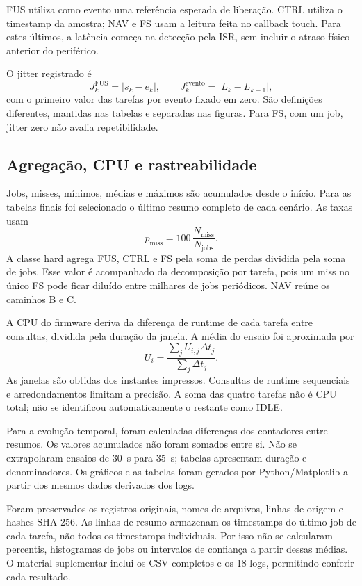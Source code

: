 FUS utiliza como evento uma referência esperada de liberação. CTRL utiliza o timestamp da amostra; NAV e FS usam a leitura feita no callback touch. Para estes últimos, a latência começa na detecção pela ISR, sem incluir o atraso físico anterior do periférico.

O jitter registrado é
\begin{equation}
J_k^{\mathrm{FUS}}=|s_k-e_k|,
\qquad
J_k^{\mathrm{evento}}=|L_k-L_{k-1}|,
\end{equation}
com o primeiro valor das tarefas por evento fixado em zero. São definições diferentes, mantidas nas tabelas e separadas nas figuras. Para FS, com um job, jitter zero não avalia repetibilidade.

\subsection{Agregação, CPU e rastreabilidade}

Jobs, misses, mínimos, médias e máximos são acumulados desde o início. Para as tabelas finais foi selecionado o último resumo completo de cada cenário. As taxas usam
\begin{equation}
p_{\mathrm{miss}}=100\,\frac{N_{\mathrm{miss}}}{N_{\mathrm{jobs}}}.
\end{equation}
A classe hard agrega FUS, CTRL e FS pela soma de perdas dividida pela soma de jobs. Esse valor é acompanhado da decomposição por tarefa, pois um miss no único FS pode ficar diluído entre milhares de jobs periódicos. NAV reúne os caminhos B e C.

A CPU do firmware deriva da diferença de runtime de cada tarefa entre consultas, dividida pela duração da janela. A média do ensaio foi aproximada por
\begin{equation}
\overline{U}_i=\frac{\sum_j U_{i,j}\Delta t_j}{\sum_j\Delta t_j}.
\end{equation}
As janelas são obtidas dos instantes impressos. Consultas de runtime sequenciais e arredondamentos limitam a precisão. A soma das quatro tarefas não é CPU total; não se identificou automaticamente o restante como IDLE.

Para a evolução temporal, foram calculadas diferenças dos contadores entre resumos. Os valores acumulados não foram somados entre si. Não se extrapolaram ensaios de 30~s para 35~s; tabelas apresentam duração e denominadores. Os gráficos e as tabelas foram gerados por Python/Matplotlib a partir dos mesmos dados derivados dos logs.

Foram preservados os registros originais, nomes de arquivos, linhas de origem e hashes SHA-256. As linhas de resumo armazenam os timestamps do último job de cada tarefa, não todos os timestamps individuais. Por isso não se calcularam percentis, histogramas de jobs ou intervalos de confiança a partir dessas médias. O material suplementar inclui os CSV completos e os 18 logs, permitindo conferir cada resultado.

\FloatBarrier

